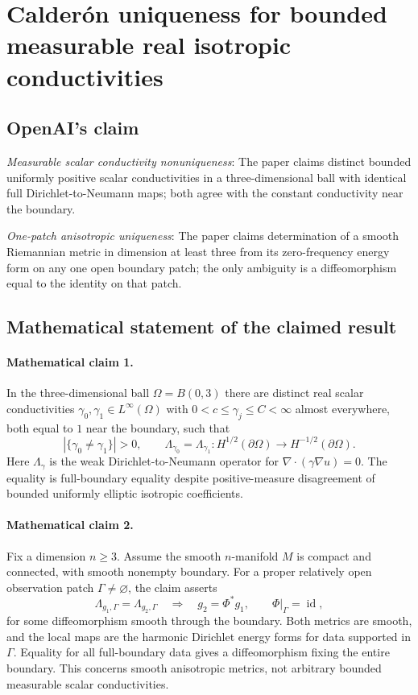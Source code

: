 \documentclass[11pt]{article}
\begin{document}
\section*{Calderón uniqueness for bounded measurable real isotropic conductivities}

\subsection{OpenAI's claim}
\textit{Measurable scalar conductivity nonuniqueness}: The paper claims distinct bounded uniformly positive scalar conductivities in a three-dimensional ball with identical full Dirichlet-to-Neumann maps; both agree with the constant conductivity near the boundary.

\textit{One-patch anisotropic uniqueness}: The paper claims determination of a smooth Riemannian metric in dimension at least three from its zero-frequency energy form on any one open boundary patch; the only ambiguity is a diffeomorphism equal to the identity on that patch.

\subsection{Mathematical statement of the claimed result}
\paragraph{Mathematical claim 1.} In the three-dimensional ball $\Omega=B(0,3)$ there are distinct real scalar conductivities $\gamma_0,\gamma_1\in L^\infty(\Omega)$ with $0<c\le\gamma_j\le C<\infty$ almost everywhere, both equal to $1$ near the boundary, such that \[|\{\gamma_0\ne\gamma_1\}|>0,\qquad\Lambda_{\gamma_0}=\Lambda_{\gamma_1}:H^{1/2}(\partial\Omega)\to H^{-1/2}(\partial\Omega).\] Here $\Lambda_\gamma$ is the weak Dirichlet-to-Neumann operator for $\nabla\cdot(\gamma\nabla u)=0$. The equality is full-boundary equality despite positive-measure disagreement of bounded uniformly elliptic isotropic coefficients.

\paragraph{Mathematical claim 2.} Fix a dimension $n\ge3$. Assume the smooth $n$-manifold $M$ is compact and connected, with smooth nonempty boundary. For a proper relatively open observation patch $\Gamma\ne\varnothing$, the claim asserts \[\Lambda_{g_1,\Gamma}=\Lambda_{g_2,\Gamma}\quad\Longrightarrow\quad g_2=\Phi^*g_1,\qquad\Phi|_\Gamma=\operatorname{id},\] for some diffeomorphism smooth through the boundary. Both metrics are smooth, and the local maps are the harmonic Dirichlet energy forms for data supported in $\Gamma$. Equality for all full-boundary data gives a diffeomorphism fixing the entire boundary. This concerns smooth anisotropic metrics, not arbitrary bounded measurable scalar conductivities.
\end{document}
